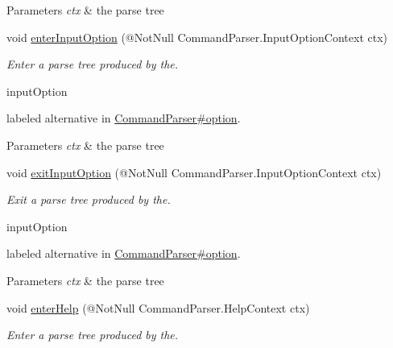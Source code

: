 \begin{DoxyCompactItemize}
\begin{DoxyCompactList}
\begin{DoxyParams}{Parameters}
{\em ctx} & the parse tree\\
\hline
\end{DoxyParams}
 \end{DoxyCompactList}\item 
void \hyperlink{classedu_1_1udel_1_1cis_1_1vsl_1_1civl_1_1run_1_1common_1_1CommandBaseListener_a4db64e57996484689628f49341b708dd}{enter\+Input\+Option} (@Not\+Null Command\+Parser.\+Input\+Option\+Context ctx)
\begin{DoxyCompactList}\small\item\em Enter a parse tree produced by the.


\begin{DoxyCode}
inputOption 
\end{DoxyCode}
 labeled alternative in \hyperlink{}{Command\+Parser\#option}. 
\begin{DoxyParams}{Parameters}
{\em ctx} & the parse tree\\
\hline
\end{DoxyParams}
 \end{DoxyCompactList}\item 
void \hyperlink{classedu_1_1udel_1_1cis_1_1vsl_1_1civl_1_1run_1_1common_1_1CommandBaseListener_aedc661bdd5b7c8737d8affa7828245e9}{exit\+Input\+Option} (@Not\+Null Command\+Parser.\+Input\+Option\+Context ctx)
\begin{DoxyCompactList}\small\item\em Exit a parse tree produced by the.


\begin{DoxyCode}
inputOption 
\end{DoxyCode}
 labeled alternative in \hyperlink{}{Command\+Parser\#option}. 
\begin{DoxyParams}{Parameters}
{\em ctx} & the parse tree\\
\hline
\end{DoxyParams}
 \end{DoxyCompactList}\item 
void \hyperlink{classedu_1_1udel_1_1cis_1_1vsl_1_1civl_1_1run_1_1common_1_1CommandBaseListener_a102804d8984e08293c9883b5ec55a0d1}{enter\+Help} (@Not\+Null Command\+Parser.\+Help\+Context ctx)
\begin{DoxyCompactList}\small\item\em Enter a parse tree produced by the.



\end{DoxyCompactList}
\end{DoxyCompactItemize}
